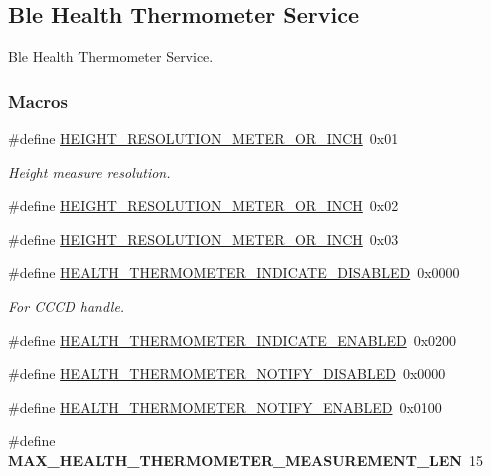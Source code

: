 \hypertarget{group___b_l_e___h_t_s}{}\subsection{Ble Health Thermometer Service}
\label{group___b_l_e___h_t_s}


Ble Health Thermometer Service.  


\subsubsection*{Macros}
\begin{DoxyCompactItemize}
\item 
\#define \hyperlink{group___b_l_e___h_t_s_gab8855ebfde88809f8236d735a99ec4e7}{H\+E\+I\+G\+H\+T\+\_\+\+R\+E\+S\+O\+L\+U\+T\+I\+O\+N\+\_\+M\+E\+T\+E\+R\+\_\+\+O\+R\+\_\+I\+N\+CH}~0x01
\begin{DoxyCompactList}\small\item\em Height measure resolution. \end{DoxyCompactList}\item 
\#define \hyperlink{group___b_l_e___h_t_s_ga08ce7291c62e7c4cbcec4e5648f9728d}{H\+E\+I\+G\+H\+T\+\_\+\+R\+E\+S\+O\+L\+U\+T\+I\+O\+N\+\_\+M\+E\+T\+E\+R\+\_\+\+O\+R\+\_\+I\+N\+CH}~0x02
\item 
\#define \hyperlink{group___b_l_e___h_t_s_gac7cc367b580e45e2e735a50c576998b4}{H\+E\+I\+G\+H\+T\+\_\+\+R\+E\+S\+O\+L\+U\+T\+I\+O\+N\+\_\+M\+E\+T\+E\+R\+\_\+\+O\+R\+\_\+I\+N\+CH}~0x03
\item 
\#define \hyperlink{group___b_l_e___h_t_s_ga0e4ce128688efe6d4594e80b7247b801}{H\+E\+A\+L\+T\+H\+\_\+\+T\+H\+E\+R\+M\+O\+M\+E\+T\+E\+R\+\_\+\+I\+N\+D\+I\+C\+A\+T\+E\+\_\+\+D\+I\+S\+A\+B\+L\+ED}~0x0000
\begin{DoxyCompactList}\small\item\em For C\+C\+CD handle. \end{DoxyCompactList}\item 
\#define \hyperlink{group___b_l_e___h_t_s_ga5628d712b0478353347e89bcf5e22767}{H\+E\+A\+L\+T\+H\+\_\+\+T\+H\+E\+R\+M\+O\+M\+E\+T\+E\+R\+\_\+\+I\+N\+D\+I\+C\+A\+T\+E\+\_\+\+E\+N\+A\+B\+L\+ED}~0x0200
\item 
\#define \hyperlink{group___b_l_e___h_t_s_gab8c1756c68e4aeb16b570ee191a74ce6}{H\+E\+A\+L\+T\+H\+\_\+\+T\+H\+E\+R\+M\+O\+M\+E\+T\+E\+R\+\_\+\+N\+O\+T\+I\+F\+Y\+\_\+\+D\+I\+S\+A\+B\+L\+ED}~0x0000
\item 
\#define \hyperlink{group___b_l_e___h_t_s_gaf39a394118c10f65034347a3959d8b2b}{H\+E\+A\+L\+T\+H\+\_\+\+T\+H\+E\+R\+M\+O\+M\+E\+T\+E\+R\+\_\+\+N\+O\+T\+I\+F\+Y\+\_\+\+E\+N\+A\+B\+L\+ED}~0x0100
\item 
\#define {\bfseries M\+A\+X\+\_\+\+H\+E\+A\+L\+T\+H\+\_\+\+T\+H\+E\+R\+M\+O\+M\+E\+T\+E\+R\+\_\+\+M\+E\+A\+S\+U\+R\+E\+M\+E\+N\+T\+\_\+\+L\+EN}~15\hypertarget{group___b_l_e___h_t_s_ga0575788637d262187bd325e5d728daff}{}\label{group___b_l_e___h_t_s_ga0575788637d262187bd325e5d728daff}

\end{DoxyCompactItemize}


